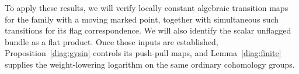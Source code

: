 To apply these results, we will verify locally constant algebraic
transition maps for the family with a moving marked point, together
with simultaneous such transitions for its flag correspondence.
We will also identify the scalar unflagged bundle as a flat product.
Once those inputs are established, Proposition~\ref{diag:gysin}
controls its push-pull maps, and Lemma~\ref{diag:finite} supplies the
weight-lowering logarithm on the same ordinary cohomology groups.
